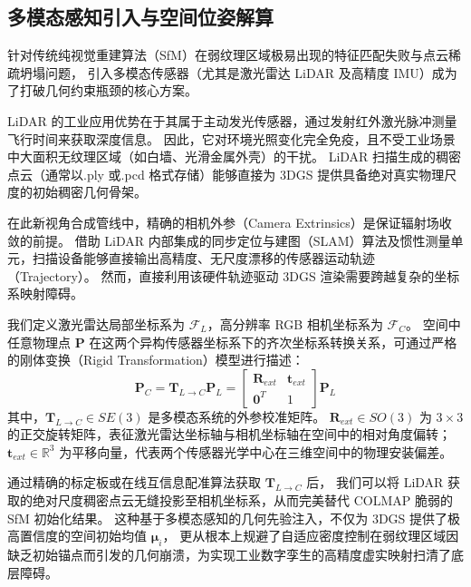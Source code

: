 \subsection{多模态感知引入与空间位姿解算}
\label{subsec:multimodal_pose_alignment}

针对传统纯视觉重建算法（SfM）在弱纹理区域极易出现的特征匹配失败与点云稀疏坍塌问题，
引入多模态传感器（尤其是激光雷达 LiDAR 及高精度 IMU）成为了打破几何约束瓶颈的核心方案。

LiDAR 的工业应用优势在于其属于主动发光传感器，通过发射红外激光脉冲测量飞行时间来获取深度信息。
因此，它对环境光照变化完全免疫，且不受工业场景中大面积无纹理区域（如白墙、光滑金属外壳）的干扰。
LiDAR 扫描生成的稠密点云（通常以.ply 或.pcd 格式存储）能够直接为 3DGS 提供具备绝对真实物理尺度的初始稠密几何骨架。

在此新视角合成管线中，精确的相机外参（Camera Extrinsics）是保证辐射场收敛的前提。
借助 LiDAR 内部集成的同步定位与建图（SLAM）算法及惯性测量单元，扫描设备能够直接输出高精度、无尺度漂移的传感器运动轨迹（Trajectory）。
然而，直接利用该硬件轨迹驱动 3DGS 渲染需要跨越复杂的坐标系映射障碍。

我们定义激光雷达局部坐标系为 $\mathcal{F}_{L}$，高分辨率 RGB 相机坐标系为 $\mathcal{F}_{C}$。
空间中任意物理点 $\bm{P}$ 在这两个异构传感器坐标系下的齐次坐标系转换关系，可通过严格的刚体变换（Rigid Transformation）模型进行描述：
\begin{equation}
    \bm{P}_C = \bm{T}_{L \to C} \bm{P}_L = 
    \begin{bmatrix} 
    \bm{R}_{ext} & \bm{t}_{ext} \\ 
    \bm{0}^T & 1 
    \end{bmatrix} 
    \bm{P}_L
\end{equation}
其中，$\bm{T}_{L \to C} \in SE(3)$ 是多模态系统的外参校准矩阵。
$\bm{R}_{ext} \in SO(3)$ 为 $3 \times 3$ 的正交旋转矩阵，表征激光雷达坐标轴与相机坐标轴在空间中的相对角度偏转；
$\bm{t}_{ext} \in \mathbb{R}^3$ 为平移向量，代表两个传感器光学中心在三维空间中的物理安装偏差。

通过精确的标定板或在线互信息配准算法获取 $\bm{T}_{L \to C}$ 后，
我们可以将 LiDAR 获取的绝对尺度稠密点云无缝投影至相机坐标系，从而完美替代 COLMAP 脆弱的 SfM 初始化结果。
这种基于多模态感知的几何先验注入，不仅为 3DGS 提供了极高置信度的空间初始均值 $\bm{\mu}_i$，
更从根本上规避了自适应密度控制在弱纹理区域因缺乏初始锚点而引发的几何崩溃，为实现工业数字孪生的高精度虚实映射扫清了底层障碍。




